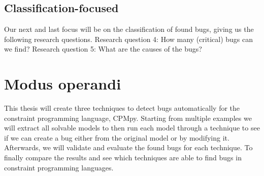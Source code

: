 
\subsection{Classification-focused}
\label{intro:RQ:ClassificationFocused}
Our next and last focus will be on the classification of found bugs, giving us the following research questions. \newline
Research question 4: How many (critical) bugs can we find? \newline
Research question 5: What are the causes of the bugs? \newline




\section{Modus operandi}
This thesis will create three techniques to detect bugs automatically for the constraint programming language, CPMpy. Starting from multiple examples we will extract all solvable models to then run each model through a technique to see if we can create a bug either from the original model or by modifying it. Afterwards, we will validate and evaluate the found bugs for each technique. To finally compare the results and see which techniques are able to find bugs in constraint programming languages.


